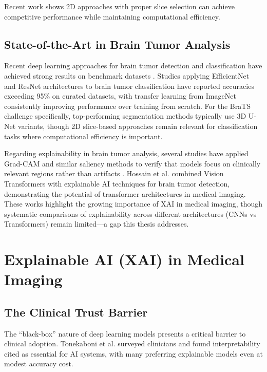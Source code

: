 Recent work shows 2D approaches with proper slice selection can achieve competitive performance while maintaining computational efficiency.

\subsection{State-of-the-Art in Brain Tumor Analysis}

Recent deep learning approaches for brain tumor detection and classification have achieved strong results on benchmark datasets \cite{solanki2023brain}. Studies applying EfficientNet and ResNet architectures to brain tumor classification have reported accuracies exceeding 95\% on curated datasets, with transfer learning from ImageNet consistently improving performance over training from scratch. For the BraTS challenge specifically, top-performing segmentation methods typically use 3D U-Net variants, though 2D slice-based approaches remain relevant for classification tasks where computational efficiency is important.

Regarding explainability in brain tumor analysis, several studies have applied Grad-CAM and similar saliency methods to verify that models focus on clinically relevant regions rather than artifacts \cite{asiri2023enhancing, velden2022explainable}. Hossain et al. \cite{hossain2024vision} combined Vision Transformers with explainable AI techniques for brain tumor detection, demonstrating the potential of transformer architectures in medical imaging. These works highlight the growing importance of XAI in medical imaging, though systematic comparisons of explainability across different architectures (CNNs vs Transformers) remain limited---a gap this thesis addresses.

\section{Explainable AI (XAI) in Medical Imaging}

\subsection{The Clinical Trust Barrier}

The ``black-box'' nature of deep learning models presents a critical barrier to clinical adoption. Tonekaboni et al. \cite{tonekaboni2019clinicians} surveyed clinicians and found interpretability cited as essential for AI systems, with many preferring explainable models even at modest accuracy cost.

